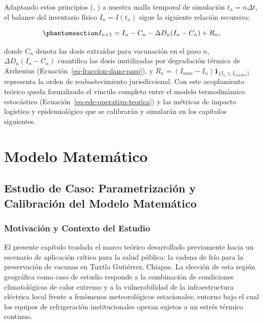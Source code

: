 \documentclass[
  spanish,
  us-letterpaper,
]{scrreprt}
\numberwithin{equation}{section}
\theoremstyle{plain}
\theoremstyle{plain}
\theoremstyle{definition}
\theoremstyle{plain}
\theoremstyle{remark}
\begin{document}
Adaptando estos principios (,
) a nuestra malla temporal de
simulación \(t_n = n\Delta t\), el balance del inventario físico
\(I_n = I(t_n)\) sigue la siguiente relación recursiva:

\begin{equation}\phantomsection\label{eq-balance-inventario-general}{
I_{n+1} = I_n - C_n - \Delta D_n (I_n - C_n) + R_n,
}\end{equation}

donde \(C_n\) denota las dosis extraídas para vacunación en el paso
\(n\), \(\Delta D_n (I_n - C_n)\) cuantifica las dosis inutilizadas por
degradación térmica de Arrhenius (Ecuación~\ref{eq-fraccion-dano-paso}),
y \(R_n = (I_{max} - I_n)\mathbf{1}_{\{I_n \le I_{reorden}\}}\)
representa la orden de reabastecimiento jurisdiccional. Con este
acoplamiento teórico queda formalizado el vínculo completo entre el
modelo termodinámico estocástico
(Ecuación~\ref{eq-ede-operativa-teorica}) y las métricas de impacto
logístico y epidemiológico que se calibrarán y simularán en los
capítulos siguientes.

\part{Modelo Matemático}

\chapter{Estudio de Caso: Parametrización y Calibración del Modelo
Matemático}\label{sec-estudio-caso}

\section{Motivación y Contexto del
Estudio}\label{sec-motivacion-contexto}

El presente capítulo traslada el marco teórico desarrollado previamente
hacia un escenario de aplicación crítico para la salud pública: la
cadena de frío para la preservación de vacunas en Tuxtla Gutiérrez,
Chiapas. La elección de esta región geográfica como caso de estudio
responde a la combinación de condiciones climatológicas de calor extremo
y a la vulnerabilidad de la infraestructura eléctrica local frente a
fenómenos meteorológicos estacionales, entorno bajo el cual los equipos
de refrigeración institucionales operan sujetos a un estrés térmico
continuo.
\end{document}
